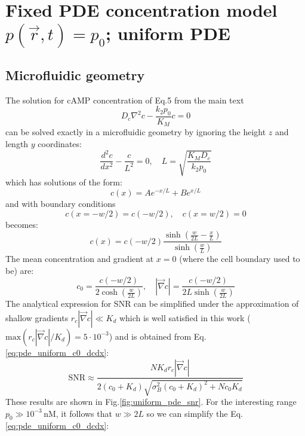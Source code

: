 \documentclass[10pt]{article}
\begin{document}
\newpage


\section{Fixed PDE concentration model $p(\vec{r},t) = p_0$; uniform PDE}


\subsection{Microfluidic geometry}

The solution for cAMP concentration of Eq.5 from the main text
\begin{equation}
		D_c\nabla^{2}c-\frac{k_2p_0}{K_M}c = 0
  \label{eq:main_sys}
\end{equation}
can be solved exactly in a microfluidic geometry by ignoring the height $z$ and length $y$ coordinates:
\begin{equation}
	\frac{d^2c}{dx^2} - \frac{c}{L^2} = 0, \quad
	L=\sqrt{\frac{K_M D_c}{k_2p_0}}
\end{equation}
which has solutions of the form:
\begin{equation}
	c(x) = Ae^{-x/L} + Be^{x/L}
\end{equation}
and with boundary conditions
\begin{equation}
	c(x=-w/2) = c(-w/2), \quad c(x = w/2) = 0 
\end{equation}
becomes:
\begin{equation}
	c(x) = c(-w/2) \frac{\sinh\left(\frac{w}{2L}-\frac{x}{L}\right)}
		{\sinh\left(\frac{w}{L}\right)}
	\label{eq:uniform_pde_analytic_sol}
\end{equation}
The mean concentration and gradient at $x=0$ (where the cell boundary used to be) are:
\begin{equation}
	c_0 = \frac{c(-w/2)}{2\cosh\left(\frac{w}{2L}\right)},\quad |\vec{\nabla} c| = \frac{c(-w/2)}{2L\sinh\left(\frac{w}{2L}\right)}
		\label{eq:pde_uniform_c0_dcdx}
\end{equation}
The analytical expression for SNR can be simplified under the approximation of shallow gradients $r_c|\vec{\nabla}c| \ll K_d$ which is well satisfied in this work ($\mathrm{max}(r_c|\vec{\nabla}c|/K_d) = 5\cdot10^{-3}$) and is obtained from Eq.\ref{eq:pde_uniform_c0_dcdx}:
\begin{equation}
	\mathrm{SNR} \approx \frac{N K_d r_c |\vec{\nabla}c|}{2(c_0 + K_d)\sqrt{\sigma_B^2(c_0 + K_d)^2 + N c_0 K_d}}
\end{equation}
These results are shown in Fig.\ref{fig:uniform_pde_snr}. For the interesting range $p_0 \gg 10^{-3}\,\mathrm{nM}$, it follows that $w \gg 2L$ so we can simplify the Eq.\ref{eq:pde_uniform_c0_dcdx}:
\end{document}

